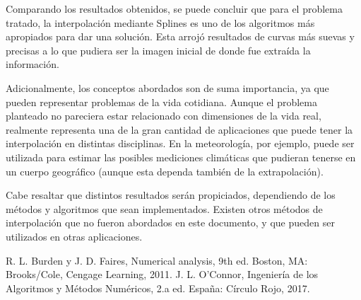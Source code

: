 \documentclass[conference]{IEEEtran}
\begin{document}
Comparando los resultados obtenidos, se puede concluir que para el problema tratado, la interpolación mediante Splines es uno de los algoritmos más apropiados para dar una solución. Esta arrojó resultados de curvas más suevas y precisas a lo que pudiera ser la imagen inicial de donde fue extraída la información. \par

Adicionalmente, los conceptos abordados son de suma importancia, ya que pueden representar problemas de la vida cotidiana. Aunque el problema planteado no pareciera estar relacionado con dimensiones de la vida real, realmente representa una de la gran cantidad de aplicaciones que puede tener la interpolación en distintas disciplinas. En la meteorología, por ejemplo, puede ser utilizada para estimar las posibles mediciones climáticas que pudieran tenerse en un cuerpo geográfico (aunque esta dependa también de la extrapolación). \par

Cabe resaltar que distintos resultados serán propiciados, dependiendo de los métodos y algoritmos que sean implementados. Existen otros métodos de interpolación que no fueron abordados en este documento, y que pueden ser utilizados en otras aplicaciones. \par

\begin{thebibliography}{00}
 R. L. Burden y J. D. Faires, Numerical analysis, 9th ed. Boston, MA: Brooks/Cole, Cengage Learning, 2011.
 J. L. O’Connor, Ingeniería de los Algoritmos y Métodos Numéricos, 2.a ed. España: Círculo Rojo, 2017.
\end{thebibliography}
\end{document}
